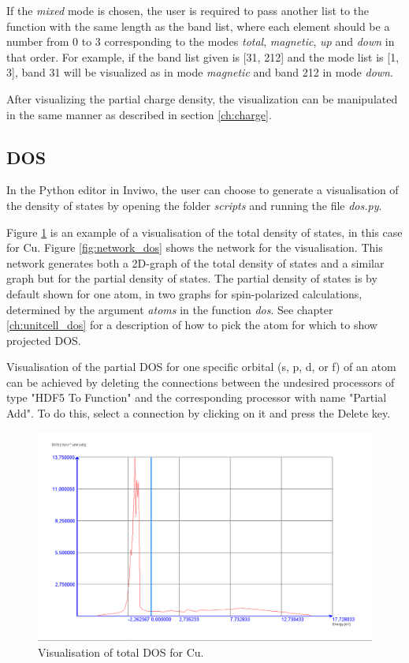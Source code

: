 \documentclass[a4paper,12pt]{article}
\begin{document}
If the \textit{mixed} mode is chosen, the user is required to pass another list to the function with the same length as the band list, where each element should be a number from  0 to 3 corresponding to the modes \textit{total}, \textit{magnetic}, \textit{up} and \textit{down} in that order. For example, if the band list given is [31, 212] and the mode list is [1, 3], band 31 will be visualized as in mode \textit{magnetic} and band 212 in mode \textit{down}.

After visualizing the partial charge density, the visualization can be manipulated in the same manner as described in section \ref{ch:charge}.

\subsection{DOS}
In the Python editor in Inviwo, the user can choose to generate a visualisation of the density of states by opening the folder \textit{scripts} and running the file \textit{dos.py}.

Figure \ref{fig:total_dos} is an example of a visualisation of the total density of states, in this case for Cu. Figure \ref{fig:network_dos} shows the network for the visualisation. This network generates both a 2D-graph of the total density of states and a similar graph but for the partial density of states. The partial density of states is by default shown for one atom, in two graphs for spin-polarized calculations, determined by the argument \textit{atoms} in the function \textit{dos}. See chapter \ref{ch:unitcell_dos} for a description of how to pick the atom for which to show projected DOS.

Visualisation of the partial DOS for one specific orbital (s, p, d, or f) of an atom can be achieved by deleting the connections between the undesired processors of type "HDF5 To Function" and the corresponding processor with name "Partial Add". To do this, select a connection by clicking on it and press the Delete key.

\begin{figure}[H]
    \centering
    \includegraphics[scale=0.35]{screenshot_total_dos_Cu_1_10.png}
    \caption{Visualisation of total DOS for Cu.}
    \label{fig:total_dos}
\end{figure}
\end{document}

